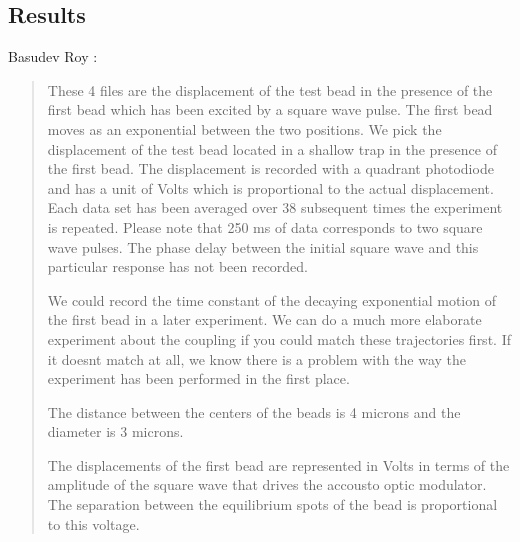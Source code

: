 \documentclass[a4paper, 11pt]{article}
\begin{document}
\subsection{Results}

Basudev Roy :

\begin{quotation}
These 4 files are the displacement of the test bead in the presence of the first bead which has been excited by a square wave pulse. The first bead moves as an exponential between the two positions. We pick the displacement of the test bead located in a shallow trap in the presence of the first bead. The displacement is recorded with a quadrant photodiode and has a unit of Volts which is proportional to the actual displacement. Each data set has been averaged over 38 subsequent times the experiment is repeated. Please note that 250 ms of data corresponds to two square wave pulses. The phase delay between the initial square wave and this particular response has not been recorded. 

We could record the time constant of the decaying exponential motion of the first bead in a later experiment. We can do a much more elaborate 
experiment about the coupling if you could match these trajectories first. If it doesnt match at all, we know there is a problem with the 
way the experiment has been performed in the first place. 

The distance between the centers of the beads is 4 microns and the diameter is 3 microns. 

The displacements of the first bead are represented in Volts in terms of the amplitude of the square wave that drives the accousto optic modulator.
The separation between the equilibrium spots of the bead is proportional to this voltage.   
\end{quotation}
\end{document}
